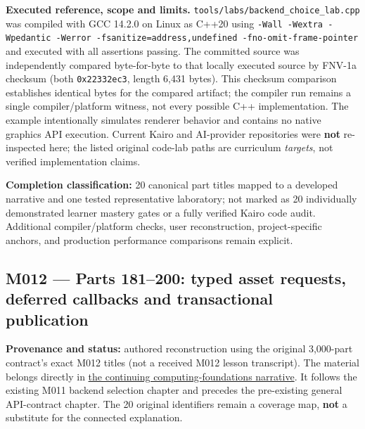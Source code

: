 \textbf{Executed reference, scope and limits.} \texttt{tools/labs/backend\_choice\_lab.cpp} was compiled with GCC 14.2.0 on Linux as C++20 using \texttt{-Wall\ -Wextra\ -Wpedantic\ -Werror\ -fsanitize=address,undefined\ -fno-omit-frame-pointer} and executed with all assertions passing. The committed source was independently compared byte-for-byte to that locally executed source by FNV-1a checksum (both \texttt{0x22332ec3}, length 6,431 bytes). This checksum comparison establishes identical bytes for the compared artifact; the compiler run remains a single compiler/platform witness, not every possible C++ implementation. The example intentionally simulates renderer behavior and contains no native graphics API execution. Current Kairo and AI-provider repositories were \textbf{not} re-inspected here; the listed original code-lab paths are curriculum \emph{targets}, not verified implementation claims.

\textbf{Completion classification:} 20 canonical part titles mapped to a developed narrative and one tested representative laboratory; not marked as 20 individually demonstrated learner mastery gates or a fully verified Kairo code audit. Additional compiler/platform checks, user reconstruction, project-specific anchors, and production performance comparisons remain explicit.

\subsection{M012 --- Parts 181--200: typed asset requests, deferred callbacks and transactional publication}\label{appendix-fd090d982a15-m012-parts-181200-typed-asset-requests-deferred-callbacks-and-transactional-publication}

\textbf{Provenance and status:} authored reconstruction using the original 3,000-part contract's exact M012 titles (not a received M012 lesson transcript). The material belongs directly in \hyperref[01-foundations-i-ch004-from-an-accepted-render-request-to-a-resource-that-survives-failures-and-callbacks]{the continuing computing-foundations narrative}. It follows the existing M011 backend selection chapter and precedes the pre-existing general API-contract chapter. The 20 original identifiers remain a coverage map, \textbf{not} a substitute for the connected explanation.

